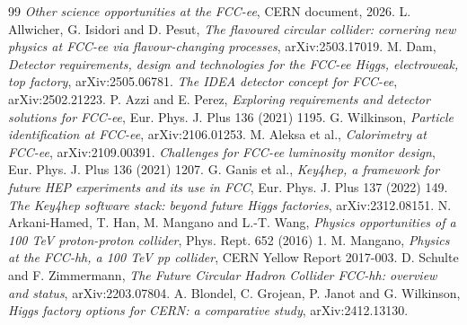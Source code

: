 \documentclass[11pt,a4paper]{article}
\numberwithin{equation}{section}
\begin{document}
\begin{thebibliography}{99}
 \emph{Other science opportunities at the FCC-ee}, CERN document, 2026.
 L. Allwicher, G. Isidori and D. Pesut, \emph{The flavoured circular collider: cornering new physics at FCC-ee via flavour-changing processes}, arXiv:2503.17019.
 M. Dam, \emph{Detector requirements, design and technologies for the FCC-ee Higgs, electroweak, top factory}, arXiv:2505.06781.
 \emph{The IDEA detector concept for FCC-ee}, arXiv:2502.21223.
 P. Azzi and E. Perez, \emph{Exploring requirements and detector solutions for FCC-ee}, Eur. Phys. J. Plus 136 (2021) 1195.
 G. Wilkinson, \emph{Particle identification at FCC-ee}, arXiv:2106.01253.
 M. Aleksa et al., \emph{Calorimetry at FCC-ee}, arXiv:2109.00391.
 \emph{Challenges for FCC-ee luminosity monitor design}, Eur. Phys. J. Plus 136 (2021) 1207.
 G. Ganis et al., \emph{Key4hep, a framework for future HEP experiments and its use in FCC}, Eur. Phys. J. Plus 137 (2022) 149.
 \emph{The Key4hep software stack: beyond future Higgs factories}, arXiv:2312.08151.
 N. Arkani-Hamed, T. Han, M. Mangano and L.-T. Wang, \emph{Physics opportunities of a 100 TeV proton-proton collider}, Phys. Rept. 652 (2016) 1.
 M. Mangano, \emph{Physics at the FCC-hh, a 100 TeV pp collider}, CERN Yellow Report 2017-003.
 D. Schulte and F. Zimmermann, \emph{The Future Circular Hadron Collider FCC-hh: overview and status}, arXiv:2203.07804.
 A. Blondel, C. Grojean, P. Janot and G. Wilkinson, \emph{Higgs factory options for CERN: a comparative study}, arXiv:2412.13130.
\end{thebibliography}
\end{document}

